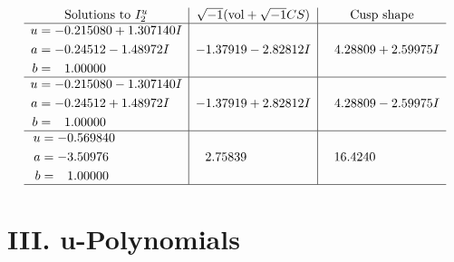 \documentclass[1p]{elsarticle_modified}
\theoremstyle{definition}
\newcommand{\I}{\sqrt{-1}}
\begin{document}
$$\begin{array}{c|c|c}  
\text{Solutions to }I^u_{2}& \I (\text{vol} + \sqrt{-1}CS) & \text{Cusp shape}\\
 \hline 
\begin{aligned}
u &= -0.215080 + 1.307140 I \\
a &= -0.24512 - 1.48972 I \\
b &= \phantom{-}1.00000\phantom{ +0.000000I}\end{aligned}
 & -1.37919 - 2.82812 I & \phantom{-}4.28809 + 2.59975 I \\ \hline\begin{aligned}
u &= -0.215080 - 1.307140 I \\
a &= -0.24512 + 1.48972 I \\
b &= \phantom{-}1.00000\phantom{ +0.000000I}\end{aligned}
 & -1.37919 + 2.82812 I & \phantom{-}4.28809 - 2.59975 I \\ \hline\begin{aligned}
u &= -0.569840\phantom{ +0.000000I} \\
a &= -3.50976\phantom{ +0.000000I} \\
b &= \phantom{-}1.00000\phantom{ +0.000000I}\end{aligned}
 & \phantom{-}2.75839\phantom{ +0.000000I} & \phantom{-}16.4240\phantom{ +0.000000I}\\
 \hline 
 \end{array}$$\newpage
\newpage\renewcommand{\arraystretch}{1}
\centering \section*{ III. u-Polynomials}
\end{document}
